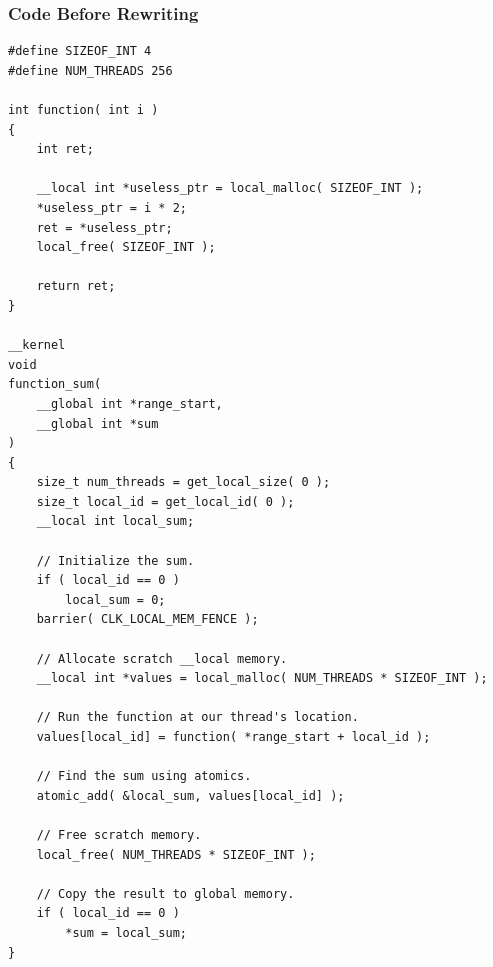\documentclass{article}
\begin{document}
\subsubsection{Code Before Rewriting}
\begin{lstlisting}
#define SIZEOF_INT 4
#define NUM_THREADS 256

int function( int i )
{
    int ret;

    __local int *useless_ptr = local_malloc( SIZEOF_INT );
    *useless_ptr = i * 2;
    ret = *useless_ptr;
    local_free( SIZEOF_INT );

    return ret;
}

__kernel
void
function_sum(
    __global int *range_start,
    __global int *sum
)
{
    size_t num_threads = get_local_size( 0 );
    size_t local_id = get_local_id( 0 );
    __local int local_sum;

    // Initialize the sum.
    if ( local_id == 0 )
        local_sum = 0;
    barrier( CLK_LOCAL_MEM_FENCE );

    // Allocate scratch __local memory.
    __local int *values = local_malloc( NUM_THREADS * SIZEOF_INT );

    // Run the function at our thread's location.
    values[local_id] = function( *range_start + local_id );

    // Find the sum using atomics.
    atomic_add( &local_sum, values[local_id] );

    // Free scratch memory.
    local_free( NUM_THREADS * SIZEOF_INT );
  
    // Copy the result to global memory.
    if ( local_id == 0 )
        *sum = local_sum;
}
\end{lstlisting}
\end{document}
